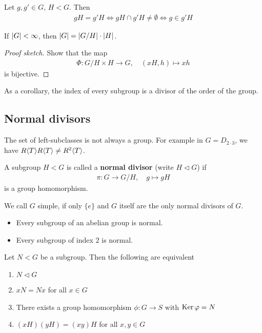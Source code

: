 \begin{prop}[]
Let $g,g' \in G$, $H < G$. Then
\begin{align*}
  gH = g'H
  \iff gH \cap g'H \neq \emptyset
  \iff g \in g'H
\end{align*}
\end{prop}

\begin{thm}[Lagrange]
If $\vert G\vert < \infty$, then $\vert G\vert = \vert G/H\vert \cdot \vert H\vert$.
\end{thm}
\begin{proof}[Proof sketch]
  Show that the map
  \begin{align*}
    \Phi: G/H \times H \to G, \quad (xH,h) \mapsto xh
  \end{align*}
  is bijective.
\end{proof}
As a corollary, the index of every subgroup is a divisor of the order of the group.

\subsection{Normal divisors}
The set of left-subclasses is not always a group. For example in $G = D_{2 \cdot 3}$, we have  $R\langle T\rangle R \langle T\rangle \neq R^{2} \langle T\rangle$.


\begin{dfn}
  A subgroup $H < G$ is called a \textbf{normal divisor} (write $H \lhd G$) if
  \begin{align*}
    \pi: G \to G/H, \quad g \mapsto  gH
  \end{align*}
  is a group homomorphism.

  We call $G$ simple, if only $\{e\}$ and $G$ itself are the only normal divisors of $G$.
\end{dfn}
\begin{itemize}
  \item Every subgroup of an abelian group is normal.
  \item Every subgroup of index $2$ is normal.
\end{itemize}

\begin{thm}
Let $N < G$ be a subgroup. Then the following are equivalent
\begin{enumerate}
  \item $N \lhd G$
  \item $xN = Nx$ for all $x \in G$
  \item There exists a group homomorphism $\phi: G \to S$ with $\operatorname{Ker} \varphi = N$
  \item $(xH)(yH) = (xy)H$ for all $x,y \in G$
\end{enumerate}
\end{thm}

